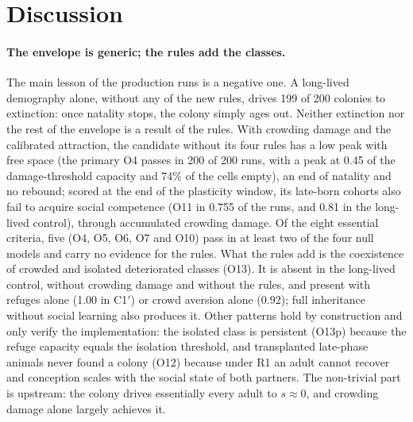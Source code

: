 \section{Discussion}
\label{sec:discussion}

\paragraph*{The envelope is generic; the rules add the classes.}
The main lesson of the production runs is a negative one. A long-lived demography alone, without any of the new
rules, drives 199 of 200 colonies to extinction: once natality stops, the colony simply ages out. Neither extinction
nor the rest of the envelope is a result of the rules. With crowding damage and the calibrated attraction, the
candidate without its four rules has a low peak with free space (the primary O4 passes in 200 of 200 runs, with a
peak at 0.45 of the damage-threshold capacity and 74\% of the cells empty), an end of natality and no rebound;
scored at the end of the plasticity window, its late-born cohorts also fail to acquire social competence (O11 in
0.755 of the runs, and 0.81 in the long-lived control), through accumulated crowding damage. Of the eight essential
criteria, five (O4, O5, O6, O7 and O10) pass in at least two of the four null models and carry no evidence for the
rules. What the rules add is the coexistence of crowded and isolated deteriorated classes (O13). It is absent in the
long-lived control, without crowding damage and without the rules, and present with refuges alone (1.00 in
\textsf{C1}$'$) or crowd aversion alone (0.92); full inheritance without social learning also produces it. Other
patterns hold by construction and only verify the implementation: the isolated class is persistent (O13p) because
the refuge capacity equals the isolation threshold, and transplanted late-phase animals never found a colony (O12)
because under R1 an adult cannot recover and conception scales with the social state of both partners. The
non-trivial part is upstream: the colony drives essentially every adult to $s\approx0$, and crowding damage alone
largely achieves it.

